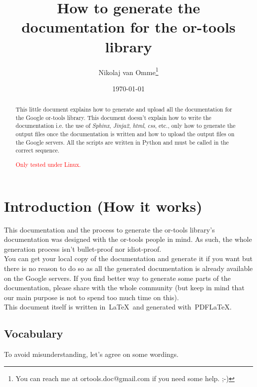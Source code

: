 \documentclass[a4paper,10pt]{article}
\title{How to generate the documentation for the or-tools library}
\author{Nikolaj van Omme\footnote{You can reach me at ortools.doc@gmail.com if you need some help. ;-) }}
\date{\today}
\begin{document}
\maketitle

\begin{abstract}
This little document explains how to generate and upload all the documentation for the Google or-tools library. This document doesn't explain how to write the documentation i.e. the use of \emph{Sphinx}, \emph{Jinja2}, \emph{html}, \emph{css}, etc., only how to generate the output files once
the documentation is written and how to upload the output files on the Google servers. All the scripts are written in Python and must be called in the correct sequence.\\
\begin{center}\textcolor{red}{Only tested under Linux.}\end{center}
\end{abstract}

\setcounter{tocdepth}{2}
\tableofcontents

\section{Introduction (How it works)}

This documentation and the process to generate the or-tools library's documentation was designed with the or-tools people in mind. As such, the whole generation process isn't bullet-proof nor idiot-proof.\\

You can get your local copy of the documentation and generate it if you want but there is no reason to do so as all the generated documentation is already available on the Google servers. If you find better way to generate some parts of the documentation, please share with the whole community (but keep in mind that our main purpose is not to spend too much time on this).\\

This document itself is written in~\LaTeX\ and generated with~PDF\LaTeX.

\subsection{Vocabulary}

To avoid misunderstanding, let's agree on some wordings.
\end{document}
